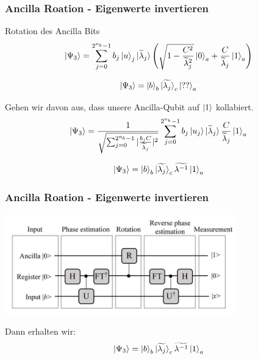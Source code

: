 \begin{frame}
    \frametitle{Ancilla Roation - Eigenwerte invertieren}
    Rotation des Ancilla Bits
$$\ket{\Psi_3} = \sum_{j=0}^{2^{n_b}-1} b_j \ket{u}_j  \ket{\widetilde{\lambda}_j} \left( \sqrt{1-\frac{C^2}{\widetilde{\lambda}_j^2}} \ket{0}_a + \frac{C}{\widetilde{\lambda}_j} \ket{1}_a\right)$$

    $$\ket{\Psi_3} = \ket{b}_b \ket{\widetilde{\lambda_j}}_c\ket{??}_a$$

    \hfil

    Gehen wir davon aus, dass unsere Ancilla-Qubit auf $\ket{1}$ kollabiert.
$$\ket{\Psi_3} = \frac {1} {\sqrt{\sum_{j=0}^{2^{n_b}-1} | \frac{b_jC} {\widetilde{\lambda}_j}|^2}}
\sum_{j=0}^{2^{n_b}-1} b_j \ket{u_j}  \ket{\widetilde{\lambda}_j} \frac{C}{\widetilde{\lambda}_j} \ket{1}_a$$

    $$\ket{\Psi_3} = \ket{b}_b \ket{\widetilde{\lambda_j}}_c \widetilde{\lambda^{-1}} \ket{1}_a$$

\end{frame}


\begin{frame}
    \frametitle{Ancilla Roation - Eigenwerte invertieren}
    \begin{center}
    \includegraphics[width=10cm]{img/hhl_circuit.jpg}
    \end{center}

    Dann erhalten wir:
    $$\ket{\Psi_3} = \ket{b}_b \ket{\widetilde{\lambda_j}}_c \widetilde{\lambda^{-1}} \ket{1}_a$$


\end{frame}


